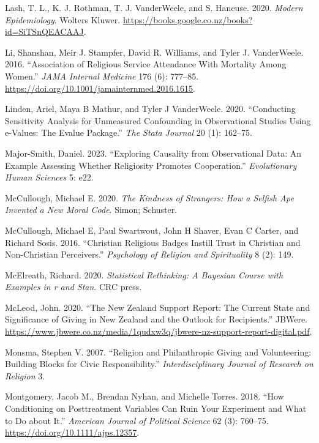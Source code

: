\documentclass[
  single column]{article}
\newlength{\cslhangindent}
\newenvironment{CSLReferences}[2] %
 {\begin{list}{}{%
  \setlength{\itemindent}{0pt}
  \setlength{\leftmargin}{0pt}
  \setlength{\parsep}{0pt}
  \ifodd #1
   \setlength{\leftmargin}{\cslhangindent}
   \setlength{\itemindent}{-1\cslhangindent}
  \fi
  \setlength{\itemsep}{#2\baselineskip}}}
 {\end{list}}
\begin{document}
\begin{CSLReferences}{1}{0}
Lash, T. L., K. J. Rothman, T. J. VanderWeele, and S. Haneuse. 2020.
\emph{Modern Epidemiology}. Wolters Kluwer.
\url{https://books.google.co.nz/books?id=SiTSnQEACAAJ}.

Li, Shanshan, Meir J. Stampfer, David R. Williams, and Tyler J.
VanderWeele. 2016. {``{Association of Religious Service Attendance With
Mortality Among Women}.''} \emph{JAMA Internal Medicine} 176 (6):
777--85. \url{https://doi.org/10.1001/jamainternmed.2016.1615}.

Linden, Ariel, Maya B Mathur, and Tyler J VanderWeele. 2020.
{``Conducting Sensitivity Analysis for Unmeasured Confounding in
Observational Studies Using e-Values: The Evalue Package.''} \emph{The
Stata Journal} 20 (1): 162--75.

Major-Smith, Daniel. 2023. {``Exploring Causality from Observational
Data: An Example Assessing Whether Religiosity Promotes Cooperation.''}
\emph{Evolutionary Human Sciences} 5: e22.

McCullough, Michael E. 2020. \emph{The Kindness of Strangers: How a
Selfish Ape Invented a New Moral Code}. Simon; Schuster.

McCullough, Michael E, Paul Swartwout, John H Shaver, Evan C Carter, and
Richard Sosis. 2016. {``Christian Religious Badges Instill Trust in
Christian and Non-Christian Perceivers.''} \emph{Psychology of Religion
and Spirituality} 8 (2): 149.

McElreath, Richard. 2020. \emph{Statistical Rethinking: A {B}ayesian
Course with Examples in r and Stan}. CRC press.

McLeod, John. 2020. {``The New Zealand Support Report: The Current State
and Significance of Giving in New Zealand and the Outlook for
Recipients.''} JBWere.
\url{https://www.jbwere.co.nz/media/1qudxw3q/jbwere-nz-support-report-digital.pdf}.

Monsma, Stephen V. 2007. {``Religion and Philanthropic Giving and
Volunteering: Building Blocks for Civic Responsibility.''}
\emph{Interdisciplinary Journal of Research on Religion} 3.

Montgomery, Jacob M., Brendan Nyhan, and Michelle Torres. 2018. {``How
Conditioning on Posttreatment Variables Can Ruin Your Experiment and
What to Do about It.''} \emph{American Journal of Political Science} 62
(3): 760--75. \url{https://doi.org/10.1111/ajps.12357}.


\end{CSLReferences}
\end{document}
